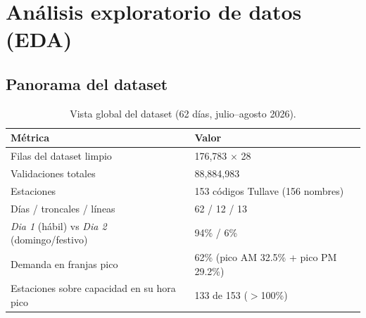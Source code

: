 \documentclass[11pt]{article}
\begin{document}
\section{Análisis exploratorio de datos (EDA)}
\label{sec:eda}
\subsection{Panorama del dataset}
\begin{table}[H]
\centering
\caption{Vista global del dataset (62 días, julio--agosto 2026).}
\label{tab:eda_resumen}
\begin{tabularx}{\textwidth}{ll}
\toprule
\textbf{Métrica} & \textbf{Valor} \\
\midrule
Filas del dataset limpio & 176,783 $\times$ 28 \\
Validaciones totales & 88,884,983 \\
Estaciones & 153 códigos Tullave (156 nombres) \\
Días / troncales / líneas & 62 / 12 / 13 \\
\emph{Dia 1} (hábil) vs \emph{Dia 2} (domingo/festivo) & 94\% / 6\% \\
Demanda en franjas pico & 62\% (pico AM 32.5\% + pico PM 29.2\%) \\
Estaciones sobre capacidad en su hora pico & 133 de 153 ($>$100\%) \\
\bottomrule
\end{tabularx}
\end{table}
\end{document}
